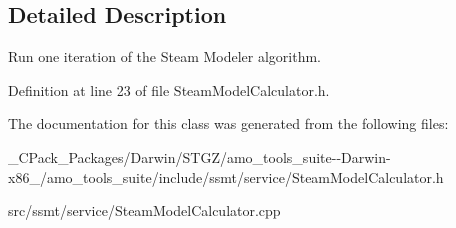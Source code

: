 \subsection{Detailed Description}
Run one iteration of the Steam Modeler algorithm. 

Definition at line 23 of file Steam\+Model\+Calculator.\+h.



The documentation for this class was generated from the following files\+:\begin{DoxyCompactItemize}
\item 
\+\_\+\+C\+Pack\+\_\+\+Packages/\+Darwin/\+S\+T\+G\+Z/amo\+\_\+tools\+\_\+suite-\/-\/\+Darwin-\/x86\+\_/amo\+\_\+tools\+\_\+suite/include/ssmt/service/Steam\+Model\+Calculator.\+h\item 
src/ssmt/service/Steam\+Model\+Calculator.\+cpp\end{DoxyCompactItemize}
